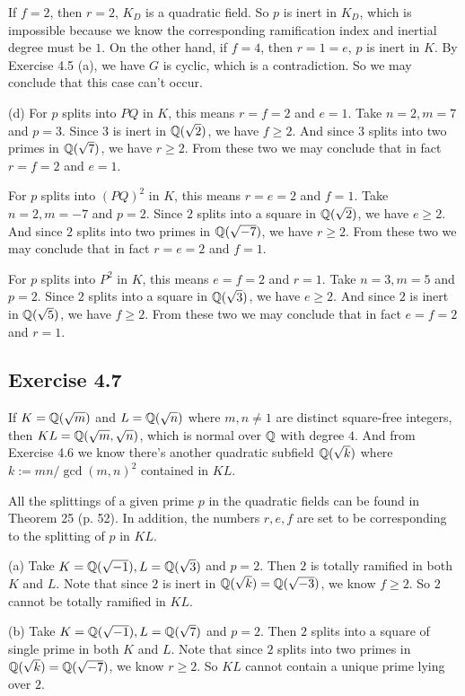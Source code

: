 \documentclass[../Marcus.tex]{subfiles}
\begin{document}
If $f=2$, then $r=2$, $K_D$ is a quadratic field. So $p$ is inert in $K_D$, which is impossible because we know the corresponding ramification index and inertial degree must be $1$. On the other hand, if $f=4$, then $r=1=e$, $p$ is inert in $K$. By Exercise 4.5 (a), we have $G$ is cyclic, which is a contradiction. So we may conclude that this case can't occur.

(d) For $p$ splits into $PQ$ in $K$, this means $r=f=2$ and $e=1$. Take $n=2,m=7$ and $p=3$. Since $3$ is inert in $\mathbb{Q}(\sqrt{2})$, we have $f\geq 2$. And since $3$ splits into two primes in $\mathbb{Q}(\sqrt{7})$, we have $r\geq 2$. From these two we may conclude that in fact $r=f=2$ and $e=1$.

For $p$ splits into $(PQ)^2$ in $K$, this means $r=e=2$ and $f=1$. Take $n=2,m=-7$ and $p=2$. Since $2$ splits into a square in $\mathbb{Q}(\sqrt{2})$, we have $e\geq 2$. And since $2$ splits into two primes in $\mathbb{Q}(\sqrt{-7})$, we have $r\geq 2$. From these two we may conclude that in fact $r=e=2$ and $f=1$.

For $p$ splits into $P^2$ in $K$, this means $e=f=2$ and $r=1$. Take $n=3,m=5$ and $p=2$. Since $2$ splits into a square in $\mathbb{Q}(\sqrt{3})$, we have $e\geq 2$. And since $2$ is inert in $\mathbb{Q}(\sqrt{5})$, we have $f\geq 2$. From these two we may conclude that in fact $e=f=2$ and $r=1$.

\subsection*{Exercise 4.7}

If $K=\mathbb{Q}(\sqrt{m})$ and $L=\mathbb{Q}(\sqrt{n})$ where $m,n\neq 1$ are distinct square-free integers, then $KL=\mathbb{Q}(\sqrt{m},\sqrt{n})$, which is normal over $\mathbb{Q}$ with degree $4$. And from Exercise 4.6 we know there's another quadratic subfield $\mathbb{Q}(\sqrt{k})$ where $k:=mn/\gcd(m,n)^2$ contained in $KL$.

All the splittings of a given prime $p$ in the quadratic fields can be found in Theorem 25 (p. 52). In addition, the numbers $r,e,f$ are set to be corresponding to the splitting of $p$ in $KL$.

(a) Take $K=\mathbb{Q}(\sqrt{-1}),L=\mathbb{Q}(\sqrt{3})$ and $p=2$. Then $2$ is totally ramified in both $K$ and $L$. Note that since $2$ is inert in $\mathbb{Q}(\sqrt{k})=\mathbb{Q}(\sqrt{-3})$, we know $f\geq 2$. So $2$ cannot be totally ramified in $KL$.

(b) Take $K=\mathbb{Q}(\sqrt{-1}),L=\mathbb{Q}(\sqrt{7})$ and $p=2$. Then $2$ splits into a square of single prime in both $K$ and $L$. Note that since $2$ splits into two primes in $\mathbb{Q}(\sqrt{k})=\mathbb{Q}(\sqrt{-7})$, we know $r\geq 2$. So $KL$ cannot contain a unique prime lying over $2$.
\end{document}
